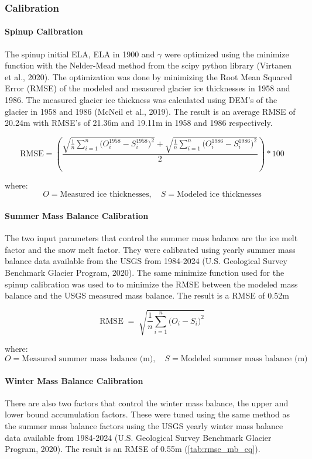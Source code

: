 \documentclass{article}
\begin{document}
\subsubsection{Calibration} 
\paragraph{Spinup Calibration}
The spinup initial ELA, ELA in 1900 and $\gamma$ were optimized using the minimize function with the Nelder-Mead method from the scipy python library (Virtanen et al., 2020).
The optimization was done by minimizing the Root Mean Squared Error (RMSE) of the modeled and measured glacier ice thicknesses in 1958 and 1986. 
The measured glacier ice thickness was calculated using DEM's of the glacier in 1958 and 1986 (McNeil et al., 2019).  
The result is an average RMSE of 20.24m with RMSE's of 21.36m and 19.11m in 1958 and 1986 respectively.

\begin{equation}
    \mathrm{RMSE} = \left(\frac{\sqrt{\frac{1}{n} \sum_{i=1}^{n} \bigl(O^{1958}_i - S^{1958}_i\bigr)^2}+\sqrt{\frac{1}{n} \sum_{i=1}^{n} \bigl(O^{1986}_i - S^{1986}_i\bigr)^2}}{2} \right)*100 \label{tab:rmse_spinup_eq}
\end{equation}

\noindent where:
$$O = \text{Measured ice thicknesses}, \quad S=\text{Modeled ice thicknesses}$$

\paragraph{Summer Mass Balance Calibration}
The two input parameters that control the summer mass balance are the ice melt factor and the snow melt factor. They were calibrated using yearly summer 
mass balance data available from the USGS from 1984-2024 (U.S. Geological Survey Benchmark Glacier Program, 2020). The same minimize function used for the spinup calibration was used to 
to minimize the RMSE between the modeled mass balance and the USGS measured mass balance. The result is a RMSE of 0.52m

\begin{equation}
    \mathrm{RMSE} \;=\; \sqrt{\frac{1}{n} \sum_{i=1}^{n} \bigl(O_i - S_i\bigr)^2} \label{tab:rmse_mb_eq}
\end{equation}
    
\noindent where:
$$O = \text{Measured summer mass balance (m)}, \quad S=\text{Modeled summer mass balance (m)}$$

\paragraph{Winter Mass Balance Calibration}
There are also two factors that control the winter mass balance, the upper and lower bound accumulation factors. These were tuned using the same 
method as the summer mass balance factors using the USGS yearly winter mass balance data available from 1984-2024 (U.S. Geological Survey Benchmark Glacier Program, 2020). 
The result is an RMSE of 0.55m (\ref{tab:rmse_mb_eq}).
\end{document}
